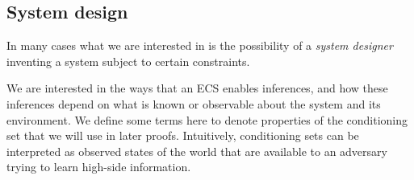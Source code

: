 \documentclass[../thesis.tex]{subfiles}
\begin{document}
\subsection{System design}
\label{sec:design}

In many cases what we are interested in is the possibility
of a \emph{system designer} inventing a system subject
to certain constraints.

%
%
%
%
%
%

%

We are interested in the ways that an ECS
enables inferences, and how these inferences
depend on what is known or observable about
the system and its environment.
We define some terms here to denote properties
of the conditioning set that we will use in
later proofs.
Intuitively, conditioning sets can be interpreted
as observed states of the world that are available
to an adversary trying to learn high-side information.
\end{document}
